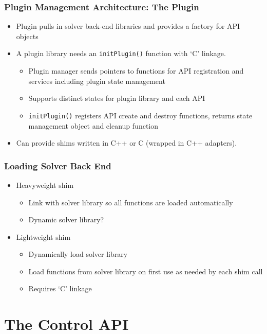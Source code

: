 \documentclass{beamer}
\begin{document}
\begin{frame}
  \frametitle{Plugin Management Architecture: The Plugin}

  \begin{itemize}
  \item Plugin pulls in solver back-end libraries and provides a
    factory for API objects
  \item A plugin library needs an \lstinline|initPlugin()| function
    with `C' linkage.
    \begin{itemize}
    \item Plugin manager sends pointers to functions for API
      registration and services including plugin state management
    \item Supports distinct states for plugin library and each API
    \item \lstinline|initPlugin()| registers API create and destroy
      functions, returns state management object and cleanup
      function
    \end{itemize}
  \item Can provide shims written in C++ or C (wrapped in C++
    adapters).
  \end{itemize}
\end{frame}

\begin{frame}
  \frametitle{Loading Solver Back End}

  \begin{itemize}
  \item Heavyweight shim
    \begin{itemize}
    \item Link with solver library so all functions are loaded
      automatically
    \item Dynamic solver library?
    \end{itemize}
  \item Lightweight shim
    \begin{itemize}
    \item Dynamically load solver library
    \item Load functions from solver library on first use as needed
      by each shim call
    \item Requires `C' linkage
    \end{itemize}
  \end{itemize}
\end{frame}

\section{The Control API}
\end{document}
